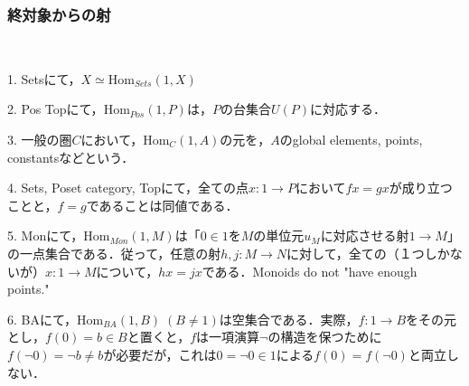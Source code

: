 \documentclass[uplatex, 12pt, dvipdfmx]{jsarticle}
\begin{document}
\subsubsection*{終対象からの射}

\begin{example}　

    1. Setsにて，$X\simeq\mathrm{Hom}_{Sets}(1,X)$
\vspace{1cm}

    2. Pos Topにて，$\mathrm{Hom}_{Pos}(1,P)$は，$P$の台集合$U(P)$に対応する．
    \vspace{1cm}

    3. 一般の圏$C$において，$\mathrm{Hom}_C(1,A)$の元を，$A$のglobal elements, points, constantsなどという．
\vspace{1cm}

    4. Sets, Poset category, Topにて，全ての点$x:1\to P$において$fx=gx$が成り立つことと，$f=g$であることは同値である．
    \vspace{1cm}

    5. Monにて，$\mathrm{Hom}_{Mon}(1,M)$は「$0\in 1$を$M$の単位元$u_M$に対応させる射$1\to M$」の一点集合である．従って，任意の射$h,j:M\to N$に対して，全ての（１つしかないが）$x:1\to M$について，$hx=jx$である．Monoids do not "have enough points."
    \vspace{1cm}

    6. BAにて，$\mathrm{Hom}_{BA}(1,B)\; (B\ne 1)$は空集合である．実際，$f:1\to B$をその元とし，$f(0)=b\in B$と置くと，$f$は一項演算$\lnot$の構造を保つために$f(\lnot 0)=\lnot b\ne b$が必要だが，これは$0=\lnot 0\in 1$による$f(0)=f(\lnot 0)$と両立しない．
\end{example}
\vspace{3cm}
\end{document}
